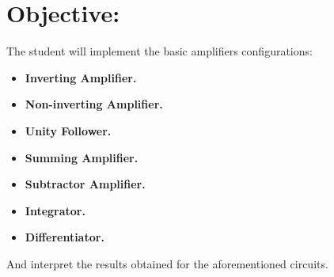 \section{Objective:}

The student will implement the basic amplifiers configurations: 

\begin{itemize}
\item {\bfseries Inverting Amplifier.}
\item {\bfseries Non-inverting Amplifier.} 
\item {\bfseries Unity Follower.} 
\item {\bfseries Summing Amplifier.} 
\item {\bfseries Subtractor Amplifier.} 
\item {\bfseries Integrator.}
\item {\bfseries Differentiator.} 
\end{itemize} 

And interpret the results obtained for the aforementioned circuits.

\pagebreak
